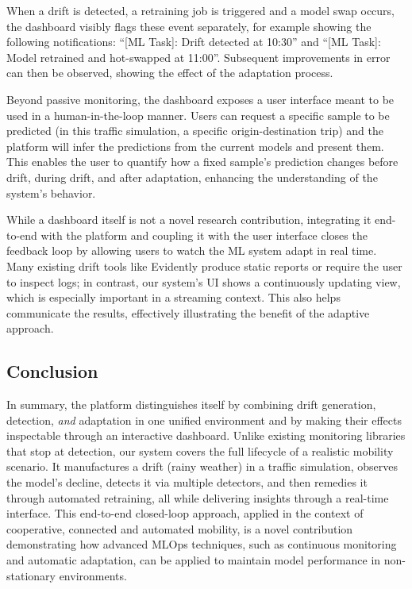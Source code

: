 When a drift is detected, a retraining job is triggered and a model swap occurs, the dashboard visibly flags these event separately, for example showing the following notifications: ``[ML Task]: Drift detected at 10:30'' and ``[ML Task]: Model retrained and hot-swapped at 11:00''.
Subsequent improvements in error can then be observed, showing the effect of the adaptation process.

Beyond passive monitoring, the dashboard exposes a user interface meant to be used in a human-in-the-loop manner.
Users can request a specific sample to be predicted (in this traffic simulation, a specific origin-destination trip) and the platform will infer the predictions from the current models and present them.
This enables the user to quantify how a fixed sample's prediction changes before drift, during drift, and after adaptation, enhancing the understanding of the system's behavior.

While a dashboard itself is not a novel research contribution, integrating it end-to-end with the platform and coupling it with the user interface closes the feedback loop by allowing users to watch the ML system adapt in real time.
Many existing drift tools like Evidently produce static reports or require the user to inspect logs; in contrast, our system's UI shows a continuously updating view, which is especially important in a streaming context.
This also helps communicate the results, effectively illustrating the benefit of the adaptive approach.

\subsection{Conclusion}
In summary, the platform distinguishes itself by combining drift generation, detection, \emph{and} adaptation in one unified environment and by making their effects inspectable through an interactive dashboard.
Unlike existing monitoring libraries that stop at detection, our system covers the full lifecycle of a realistic mobility scenario.
It manufactures a drift (rainy weather) in a traffic simulation, observes the model's decline, detects it via multiple detectors, and then remedies it through automated retraining, all while delivering insights through a real-time interface.
This end-to-end closed-loop approach, applied in the context of cooperative, connected and automated mobility, is a novel contribution demonstrating how advanced MLOps techniques, such as continuous monitoring and automatic adaptation, can be applied to maintain model performance in non-stationary environments.
